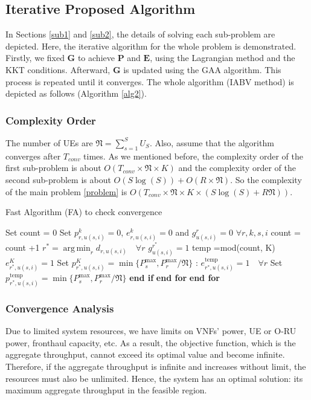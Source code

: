 \documentclass[lettersize,journal]{IEEEtran}
\DeclareMathOperator*{\argmin}{arg\,min}
\begin{document}
\subsection{Iterative Proposed Algorithm}
In Sections \eqref{sub1} and \eqref{sub2}, the details of solving each sub-problem are depicted.
Here, the iterative algorithm for the whole problem is demonstrated.
Firstly, we fixed $\boldsymbol{G}$ to achieve $\boldsymbol{P}$ and $\boldsymbol{E}$, using the Lagrangian method and the KKT conditions.
Afterward, $\boldsymbol{G}$ is updated using the GAA algorithm. This process is repeated until it converges.
The whole algorithm (IABV method) is depicted as follows (Algorithm \ref{alg2}).

\subsubsection{Complexity Order}
The number of UEs are $\mathfrak{N} = \sum_{s=1}^{S}U_S$.
Also, assume that the algorithm converges after $T_{conv}$ times.
As we mentioned before, the complexity order of the first sub-problem is about $O(T_{conv} \times \mathfrak{N} \times K)$
and the complexity order of the second sub-problem is about $O(S\log(S)) + O(R\times \mathfrak{N})$.
So the complexity of the main problem \eqref{problem} is $O(T_{conv} \times \mathfrak{N} \times K \times (S\log(S)+R\mathfrak{N}))$.
 \begin{algorithm}
 \small
\caption{Fast Algorithm (FA) to check convergence}\label{alg3}
\begin{algorithmic}[1]
\State Set count = 0
\State Set $p_{r,u(s,i)}^{k} = 0$, $e_{r,u(s,i)}^{k} = 0$ and $g_{u(s,i)}^{r} = 0$ $\forall r,k,s,i$
\State count = count +1
\State $r^* = \argmin_r d_{r,u(s,i)} \quad \forall r$
\State $g_{u(s,i)} ^{r^*}=1$
\State temp =mod(count, K)
\State $e_{r^*,u(s,i)}^{K} = 1 $
\State Set $p_{r^*,u(s,i)}^{K} = \min\{P_s^{\max}, P_r^{\max}/\mathfrak{N}\} $
\Else: $e_{r^*,u(s,i)}^{\text{temp}} = 1 \quad \forall r$
\State Set $p_{r^*,u(s,i)}^{\text{temp}} = \min\{P_s^{\max}, P_r^{\max}/\mathfrak{N}\} $
\EndIf
\State \textbf{end if}
\EndFor
\State \textbf{end for}
\EndFor
\State \textbf{end for}
\end{algorithmic}
\end{algorithm}
\subsubsection{Convergence Analysis}
Due to limited system resources, we have limits on VNFs' power, UE or O-RU power, fronthaul capacity, etc. As a result, the objective function, which is the aggregate throughput, cannot exceed its optimal value and become infinite. Therefore, if the aggregate throughput is infinite and increases without limit, the resources must also be unlimited. Hence, the system has an optimal solution: its maximum aggregate throughput in the feasible region.
 
\end{document}
